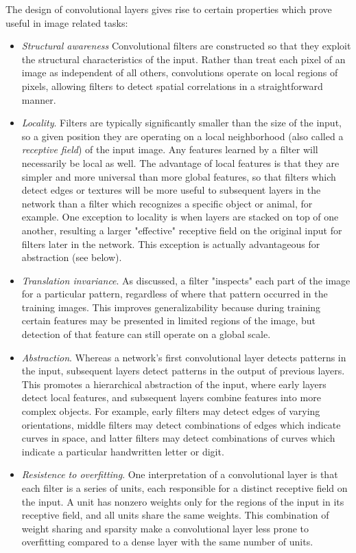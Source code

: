 The design of convolutional layers gives rise to certain properties which prove useful in image related tasks:
 \begin{itemize}
 	\item \textit{Structural awareness}
 	Convolutional filters are constructed so that they exploit the structural characteristics of the input.
 	Rather than treat each pixel of an image as independent of all others, convolutions operate on local regions of pixels, allowing filters to detect spatial correlations in a straightforward manner.
 	\item \textit{Locality}. 
 	Filters are typically significantly smaller than the size of the input, so a given position they are operating on a local neighborhood (also called a \textit{receptive field}) of the input image. 
 	Any features learned by a filter will necessarily be local as well. 
 	The advantage of local features is that they are simpler and more universal than more global features, so that filters which detect edges or textures will be more useful to subsequent layers in the network than a filter which recognizes a specific object or animal, for example. 
 	One exception to locality is when layers are stacked on top of one another, resulting a larger "effective" receptive field on the original input for filters later in the network.
 	This exception is actually advantageous for abstraction (see below).
 	\item \textit{Translation invariance}. 
 	As discussed, a filter "inspects" each part of the image for a particular pattern, regardless of where that pattern occurred in the training images.
 	This improves generalizability because during training certain features may be presented in limited regions of the image, but detection of that feature can still operate on a global scale.
 	\item \textit{Abstraction}. Whereas a network's first convolutional layer detects patterns in the input, subsequent layers detect patterns in the output of previous layers. 
 	This promotes a hierarchical abstraction of the input, where early layers detect local features, and subsequent layers combine features into more complex objects. 
 	For example, early filters may detect edges of varying orientations, middle filters may detect combinations of edges which indicate curves in space, and latter filters may detect combinations of curves which indicate a particular handwritten letter or digit.
 	\item \textit{Resistence to overfitting}. 
 	One interpretation of a convolutional layer is that each filter is a series of units, each responsible for a distinct receptive field on the input.
 	A unit has nonzero weights only for the regions of the input in its receptive field, and all units share the same weights. 
 	This combination of weight sharing and sparsity make a convolutional layer less prone to overfitting compared to a dense layer with the same number of units.
 \end{itemize}

